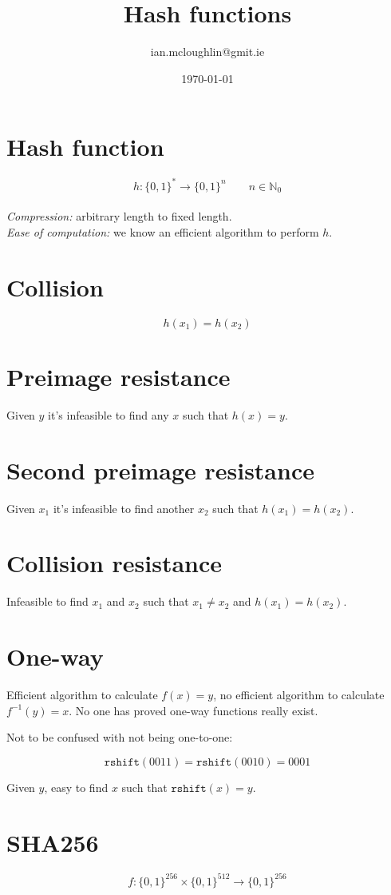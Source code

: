 \documentclass{notes}
\title{Hash functions}
\author{ian.mcloughlin@gmit.ie}
\date{\today}
\begin{document}
  \section*{Hash function}
  \[h:\{0,1\}^* \rightarrow \{0,1\}^n \qquad n \in \mathbb{N}_0 \] \\
  \textit{Compression:} arbitrary length to fixed length. \\[2mm]
  \textit{Ease of computation:} we know an efficient algorithm to perform \(h\).
 

  \section*{Collision}
  \[h(x_1) = h(x_2) \]

  \section*{Preimage resistance}
  Given \(y\) it's infeasible to find any \(x\) such that \(h(x) = y\).

  \section*{Second preimage resistance}
  Given \(x_1\) it's infeasible to find another \(x_2\) such that \(h(x_1) = h(x_2)\).

  \section*{Collision resistance}
  Infeasible to find \(x_1\) and \(x_2\) such that \( x_1 \neq x_2 \) and \(h(x_1) = h(x_2)\).

  \section*{One-way}
  Efficient algorithm to calculate \(f(x) = y\), no efficient algorithm to calculate \(f^{-1}(y) = x\).
  No one has proved one-way functions really exist.
  
  
  Not to be confused with not being one-to-one:

  \[\mathtt{rshift}(0011) = \mathtt{rshift}(0010) = 0001 \]

  Given \(y\), easy to find \(x\) such that \(\mathtt{rshift}(x) = y\).

  \section*{SHA256}
  \[f: \{0,1\}^{256} \times \{0,1\}^{512} \rightarrow \{0,1\}^{256}\]
\end{document}
